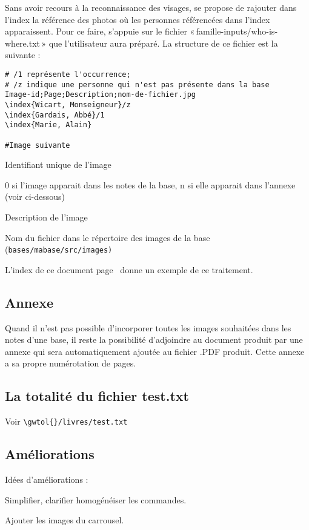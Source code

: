 Sans avoir recours à la reconnaissance des visages, \gwtol{} se propose de
rajouter dans l'index la référence des photos où les personnes référencées
dans l'index apparaissent. Pour ce faire, \gwtol{} s'appuie sur le fichier
«\,famille-inputs/who-is-where.txt\,» que l'utilisateur aura préparé.
La structure de ce fichier est la suivante :

\begin{verbatim}
# /1 représente l'occurrence;
# /z indique une personne qui n'est pas présente dans la base
Image-id;Page;Description;nom-de-fichier.jpg
\index{Wicart, Monseigneur}/z
\index{Gardais, Abbé}/1
\index{Marie, Alain}

#Image suivante
\end{verbatim}
\begin{description}[style=nextline]
\item[Image-id] Identifiant unique de l'image
\item[Page] 0 si l'image apparait dans les notes de la base, n si elle apparait
dans l'annexe (voir ci-dessous)
\item[Description] Description de l'image
\item[Nom-de-fichier] Nom du fichier dans le répertoire des images de la base
(\tt{bases/mabase/src/images})
\end{description}

L'index de ce document page~\pageref{index} donne un exemple de ce traitement.

\subsection{Annexe}
\label{annexe}
Quand il n'est pas possible d'incorporer toutes les images souhaitées dans les
notes d'une base, il reste la possibilité d'adjoindre au document produit par
\gwtol{} une annexe qui sera automatiquement ajoutée au fichier .PDF produit.
Cette annexe a sa propre numérotation de pages.

\subsection{La totalité du fichier test.txt}

Voir \verb|\gwtol{}/livres/test.txt|

\subsection{Améliorations}

Idées d'améliorations :
\begin{description}
\item Simplifier, clarifier homogénéiser les commandes.
\item Ajouter les images du carrousel.
\end{description}

